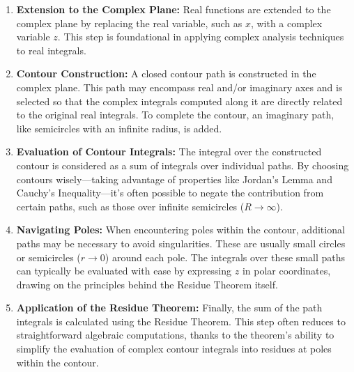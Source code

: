 \documentclass[12pt]{article}
\begin{document}
\begin{enumerate}
    \item \textbf{Extension to the Complex Plane:} Real functions are extended to the complex plane by replacing the real variable, such as \(x\), with a complex variable \(z\). This step is foundational in applying complex analysis techniques to real integrals.
    
    \item \textbf{Contour Construction:} A closed contour path is constructed in the complex plane. This path may encompass real and/or imaginary axes and is selected so that the complex integrals computed along it are directly related to the original real integrals. To complete the contour, an imaginary path, like semicircles with an infinite radius, is added. 
    
    \item \textbf{Evaluation of Contour Integrals:} The integral over the constructed contour is considered as a sum of integrals over individual paths. By choosing contours wisely—taking advantage of properties like Jordan's Lemma and Cauchy's Inequality—it's often possible to negate the contribution from certain paths, such as those over infinite semicircles (\(R \rightarrow \infty\)).
    
    \item \textbf{Navigating Poles:} When encountering poles within the contour, additional paths may be necessary to avoid singularities. These are usually small circles or semicircles (\(r \rightarrow 0\)) around each pole. The integrals over these small paths can typically be evaluated with ease by expressing \(z\) in polar coordinates, drawing on the principles behind the Residue Theorem itself.
    
    \item \textbf{Application of the Residue Theorem:} Finally, the sum of the path integrals is calculated using the Residue Theorem. This step often reduces to straightforward algebraic computations, thanks to the theorem's ability to simplify the evaluation of complex contour integrals into residues at poles within the contour.
\end{enumerate}
\end{document}
